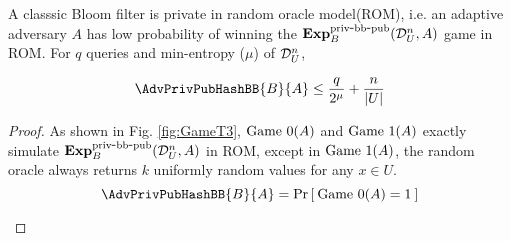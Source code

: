 \begin{theorem}\label{thm3}
A classsic Bloom filter is private in random oracle model(ROM), i.e. an adaptive adversary $A$ has low probability of winning the $\mathrm{\mathbf{Exp}}^{\mathrm{priv \mbox{-} bb\mbox{-}pub}}_{B}(\mathcal{D}_{U}^{n},A)$ game in ROM. For $q$ queries and min-entropy ($\mu$) of $\mathcal{D}_{U}^{n}$,

\begin{equation}
\AdvPrivPubHashBB{B}{A} \leq  \frac{q}{2^\mu} + \frac{n}{\abs{U}}
\end{equation}

\end{theorem}

\begin{proof}
As shown in Fig. \ref{fig:GameT3}, $\text{Game 0}(A)$ and $\text{Game 1}(A)$ exactly simulate $\mathrm{\mathbf{Exp}}^{\mathrm{priv \mbox{-} bb\mbox{-}pub}}_{B}(\mathcal{D}_{U}^{n}, A)$ in ROM, except in $\text{Game 1}(A)$, the random oracle always returns $k$ uniformly random values for any $x \in U$.
\begin{equation}
\AdvPrivPubHashBB{B}{A} = \Prob{\game{0}(A)=1}\label{eq:0T3}
\end{equation}
\begin{figure}
\centering
{}
\end{figure}
\end{proof}

